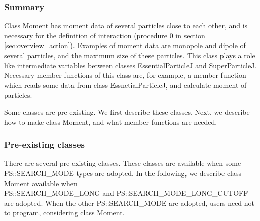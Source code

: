 \subsubsection{Summary}

Class Moment has moment data of several particles close to each other,
and is necessary for the definition of interaction (procedure 0 in
section \ref{sec:overview_action}). Examples of moment data are
monopole and dipole of several particles, and the maximum size of
these particles. This class plays a role like intermediate variables
between classes EssentialParticleJ and SuperParticleJ. Necessary
member functions of this class are, for example, a member function
which reads some data from class EssnetialParticleJ, and calculate
moment of particles.

Some classes are pre-existing. We first describe these classes. Next,
we describe how to make class Moment, and what member functions are
needed.

\subsubsection{Pre-existing classes}


There are several pre-existing classes. These classes are available
when some PS::SEARCH\_MODE types are adopted. In the following, we
describe class Moment available when \\ PS::SEARCH\_MODE\_LONG and
PS::SEARCH\_MODE\_LONG\_CUTOFF are adopted. When the other
PS::SEARCH\_MODE are adopted, users need not to program, considering
class Moment.

